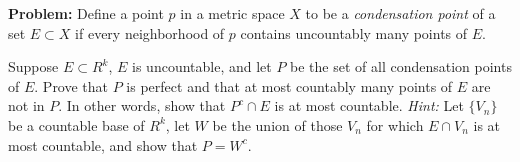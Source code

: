 \documentclass[10pt]{article}
\newenvironment{problem}{\textbf{Problem:}}{}
\begin{document}
	\begin{problem}
		Define a point \( p \) in a metric space \( X \) to be a \textit{condensation point} of a set 
		\( E \subset X \) if every neighborhood of \( p \) contains uncountably many points of \( E \). 

		Suppose \( E \subset R^{k} \), \( E \) is uncountable, and let \( P \) be the set of all condensation 
		points of \( E \). Prove that \( P \) is perfect and that at most countably many points of \( E \) are not 
		in \( P \). In other words, show that \( P^{c}\cap E \) is at most countable. \textit{Hint:} Let 
		\( \{V_n\}  \) be a countable base of \( R^{k} \), let \( W \) be the union of those \( V_n \) 
		for which \( E \cap V_n \) is at most countable, and show that \( P = W^{c} \). 
	\end{problem}
\end{document}
